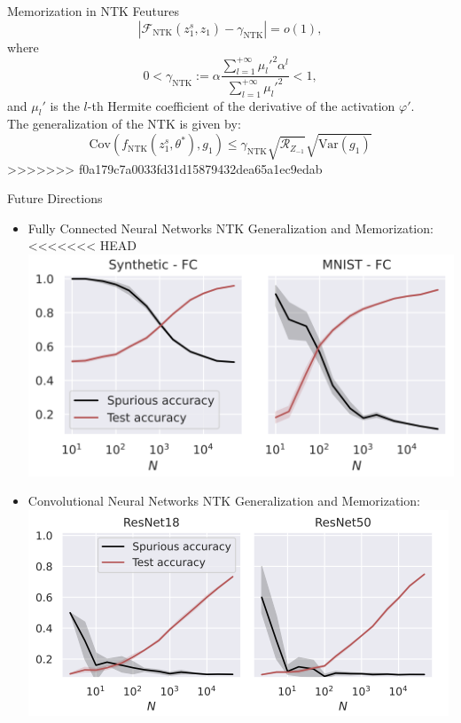\documentclass[serif, aspectratio=169]{beamer}
\begin{document}
\begin{frame}{Memorization in NTK Feutures}
    \[
    \left| \mathcal{F}_{\text{NTK}}(z_1^s, z_1) - \gamma_{\text{NTK}} \right| = o(1),
    \]
    where 
    \[
    0 < \gamma_{\text{NTK}} := \alpha \frac{\sum_{l=1}^{+\infty} \mu_l'^2 \alpha^l}{\sum_{l=1}^{+\infty} \mu_l'^2} < 1, \tag{26}
    \]
    and $\mu_l'$ is the $l$-th Hermite coefficient of the derivative of the activation $\varphi'$.\\
    The generalization of the NTK is given by:
    \[
        \text{Cov}\left(f_{\text{NTK}}(z_1^s, \theta^*), g_1\right) \leq \gamma_{\text{NTK}} \sqrt{\mathcal{R}_{Z_{-1}}} \sqrt{\text{Var}(g_1)}
    \]
>>>>>>> f0a179c7a0033fd31d15879432dea65a1ec9edab
\end{frame}
\begin{frame}{Future Directions}
	\begin{itemize}
		\item Fully Connected Neural Networks NTK Generalization and Memorization:
<<<<<<< HEAD
		\centering
		\includegraphics[keepaspectratio, scale=0.5]{pic/FC.png}
		\item Convolutional Neural Networks NTK Generalization and Memorization:
		\centering
		\includegraphics[keepaspectratio, scale=0.5]{pic/CNN.png}
	\end{itemize}
\end{frame}
\end{document}
